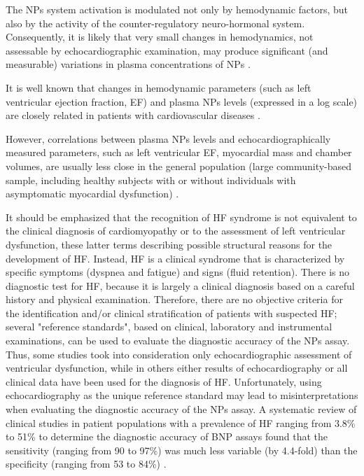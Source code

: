 \documentclass[14pt,a4paper,onecolumn]{extarticle}
\begin{document}
The NPs system activation is modulated not only by hemodynamic factors, but also by the activity of the counter-regulatory neuro-hormonal system. Consequently, it is likely that very small changes in hemodynamics, not assessable by echocardiographic examination, may produce significant (and measurable) variations in plasma concentrations of NPs \citep{bib360}.

It is well known that changes in hemodynamic parameters (such as left ventricular ejection fraction, EF) and plasma NPs levels (expressed in a log scale) are closely related in patients with cardiovascular diseases  \citep{bib32} \citep{bib33} \citep{bib34} \citep{bib35}  \citep{bib360} \citep{bib363} \citep{bib364}.

However, correlations between plasma NPs levels and echocardiographically measured parameters, such as left ventricular EF, myocardial mass and chamber volumes, are usually less close in the general population (large community-based sample, including healthy subjects with or without individuals with asymptomatic myocardial dysfunction) \citep{bib38} \citep{bib39} \citep{bib366} \citep{bib367}.

It should be emphasized that the recognition of HF syndrome is not equivalent to the clinical diagnosis of cardiomyopathy or to the assessment of left ventricular dysfunction, these latter terms describing possible structural reasons for the development of HF. Instead, HF is a clinical syndrome that is characterized by specific symptoms (dyspnea and fatigue) and signs (fluid retention). There is no diagnostic test for HF, because it is largely a clinical diagnosis based on a careful history and physical examination. Therefore, there are no objective criteria for the identification and/or clinical stratification of patients with suspected HF; several "reference standards", based on clinical, laboratory and instrumental examinations, can be used to evaluate the diagnostic accuracy of the NPs assay. Thus, some studies took into consideration only echocardiographic assessment of ventricular dysfunction, while in others either results of echocardiography or all clinical data have been used for the diagnosis of HF.  Unfortunately, using echocardiography as the unique reference standard may lead to misinterpretations when evaluating the diagnostic accuracy of the NPs assay. A systematic review of clinical studies in patient populations with a prevalence of HF ranging from 3.8\% to 51\% to determine the diagnostic accuracy of BNP assays found that the sensitivity (ranging from 90 to 97\%) was much less variable (by 4.4-fold) than the specificity (ranging from 53 to 84\%) \citep{bib35}.
\end{document}

